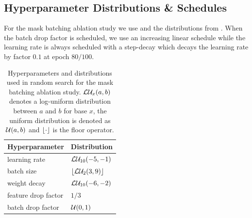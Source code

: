 \subsection{Hyperparameter Distributions \& Schedules}
\label{sec:abl-distr}
For the mask batching ablation study we use \adam \cite{Kingma2015} and the distributions from . When the batch drop factor is scheduled, we use an increasing linear schedule while the learning rate is always scheduled with a step-decay which decays the learning rate by factor $0.1$ at epoch $80/100$.
\begin{table}[!htbp]
    \centering
    \begin{tabular}{ll}
        \toprule
        \textbf{Hyperparameter} & \textbf{Distribution} \\
        \midrule
        learning rate & $\mathcal{L}\mathcal{U}_{10}(-5, -1)$ \\
        batch size  & $\lfloor\mathcal{L}\mathcal{U}_{2}(3, 9)\rfloor$ \\
        weight decay  & $\mathcal{L}\mathcal{U}_{10}(-6, -2)$ \\
        feature drop factor  & $1/3$ \\
        batch drop factor  & $\mathcal{U}(0, 1)$ \\
         \bottomrule 
    \end{tabular}
    \caption[Hyperparameters and distributions used for the mask batching ablation study]{Hyperparameters and distributions used in random search for the mask batching ablation study. $\mathcal{L}\mathcal{U}_{x}(a, b)$ denotes a log-uniform distribution between $a$ and $b$ for base $x$, the uniform distribution is denoted as $\mathcal{U}(a, b)$ and $\lfloor\cdot\rfloor$ is the floor operator.}
    \label{tab:abl-distributions-mask-batching}
\end{table}

